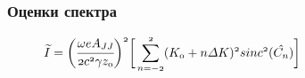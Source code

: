 \documentclass[14pt, hyperref = {colorlinks},xcolor=table ]{beamer}
\begin{document}
\small
\begin{frame}
\frametitle{Оценки спектра}\label{t1}
\vspace{-5pt}
\begin{figure}[h]
\begin{minipage}[h]{0.49\linewidth}
	\vspace{-10pt}
\end{minipage}	

\end{figure}
\vspace{-15pt}
\begin{figure}[h]
$\mathnormal{{\widetilde{I}} =
	\bigg(\cfrac{\omega eA_{JJ}}{2c^2 \gamma z_0}\bigg)^2\bigg[
	\displaystyle\sum\limits_{n =-2}^{2}(K_0 + n\Delta K)^2sinc^2(\hat{C_n})}\bigg]$\\

\end{figure}
\end{frame}
\end{document}
